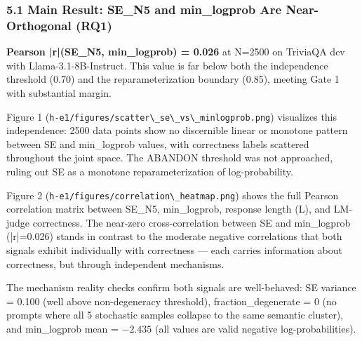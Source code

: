 
\subsubsection{5.1 Main Result: SE\_N5 and min\_logprob Are Near-Orthogonal (RQ1)}

\textbf{Pearson |r|(SE\_N5, min\_logprob) = 0.026} at N=2500 on TriviaQA dev with Llama-3.1-8B-Instruct. This value is far below both the independence threshold (0.70) and the reparameterization boundary (0.85), meeting Gate 1 with substantial margin.

Figure 1 (\texttt{h-e1/figures/scatter\textbackslash \_se\textbackslash \_vs\textbackslash \_minlogprob.png}) visualizes this independence: 2500 data points show no discernible linear or monotone pattern between SE and min\_logprob values, with correctness labels scattered throughout the joint space. The ABANDON threshold was not approached, ruling out SE as a monotone reparameterization of log-probability.

Figure 2 (\texttt{h-e1/figures/correlation\textbackslash \_heatmap.png}) shows the full Pearson correlation matrix between SE\_N5, min\_logprob, response length (L), and LM-judge correctness. The near-zero cross-correlation between SE and min\_logprob (|r|=0.026) stands in contrast to the moderate negative correlations that both signals exhibit individually with correctness --- each carries information about correctness, but through independent mechanisms.

\begin{table}[htbp]
\centering
{}
\end{table}

The mechanism reality checks confirm both signals are well-behaved: SE variance = 0.100 (well above non-degeneracy threshold), fraction\_degenerate = 0 (no prompts where all 5 stochastic samples collapse to the same semantic cluster), and min\_logprob mean = $-2.435$ (all values are valid negative log-probabilities).

